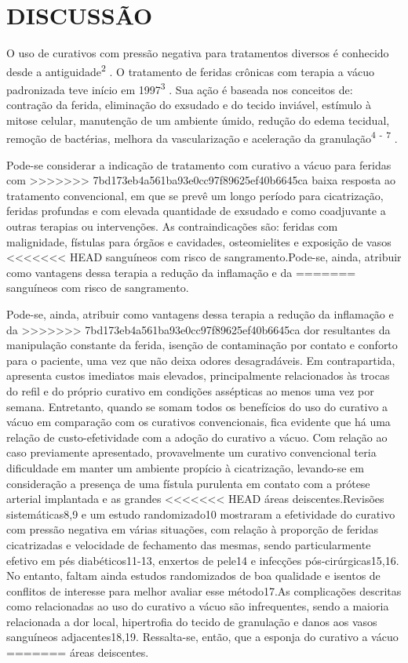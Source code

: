 \documentclass[numberinsection,times,10pt,spreadimages]{memoir}
\begin{document}
\section{DISCUSSÃO}

O uso de curativos com pressão negativa para tratamentos diversos é conhecido
desde a
antiguidade\textsuperscript{2}
. O tratamento de
feridas crônicas com terapia a vácuo padronizada teve início em
1997\textsuperscript{3}
. Sua ação é baseada nos conceitos
de: contração da ferida, eliminação do exsudado e do tecido inviável, estímulo à
mitose celular, manutenção de um ambiente úmido, redução do edema tecidual,
remoção
de bactérias, melhora da vascularização e aceleração da
granulação\textsuperscript{4}
\textsuperscript{-}
\textsuperscript{7}
.

Pode-se considerar a indicação de tratamento com curativo a vácuo para feridas
com
>>>>>>> 7bd173eb4a561ba93e0cc97f89625ef40b6645ca
baixa resposta ao tratamento convencional, em que se prevê um longo período para
cicatrização, feridas profundas e com elevada quantidade de exsudado e como
coadjuvante a outras terapias ou intervenções. As contraindicações são: feridas
com
malignidade, fístulas para órgãos e cavidades, osteomielites e exposição de
vasos
<<<<<<< HEAD
sanguíneos com risco de sangramento.Pode-se, ainda, atribuir como vantagens
dessa terapia a redução da inflamação e da
=======
sanguíneos com risco de sangramento.

Pode-se, ainda, atribuir como vantagens dessa terapia a redução da inflamação e
da
>>>>>>> 7bd173eb4a561ba93e0cc97f89625ef40b6645ca
dor resultantes da manipulação constante da ferida, isenção de contaminação por
contato e conforto para o paciente, uma vez que não deixa odores desagradáveis.
Em
contrapartida, apresenta custos imediatos mais elevados, principalmente
relacionados
às trocas do refil e do próprio curativo em condições assépticas ao menos uma
vez
por semana. Entretanto, quando se somam todos os benefícios do uso do curativo a
vácuo em comparação com os curativos convencionais, fica evidente que há uma
relação
de custo-efetividade com a adoção do curativo a vácuo. Com relação ao caso
previamente apresentado, provavelmente um curativo convencional teria
dificuldade em
manter um ambiente propício à cicatrização, levando-se em consideração a
presença de
uma fístula purulenta em contato com a prótese arterial implantada e as grandes
<<<<<<< HEAD
áreas deiscentes.Revisões sistemáticas8,9 e um estudo randomizado10 mostraram a
efetividade do curativo com pressão
negativa em várias situações, com relação à proporção de feridas cicatrizadas e
velocidade de fechamento das mesmas, sendo particularmente efetivo em pés
diabéticos11-13, enxertos de pele14 e infecções pós-cirúrgicas15,16. No entanto,
faltam ainda estudos randomizados
de boa qualidade e isentos de conflitos de interesse para melhor avaliar esse
método17.As complicações descritas como relacionadas ao uso do curativo a vácuo
são
infrequentes, sendo a maioria relacionada a dor local, hipertrofia do tecido de
granulação e danos aos vasos sanguíneos adjacentes18,19. Ressalta-se, então, que
a esponja do curativo a vácuo
=======
áreas deiscentes.
\end{document}
